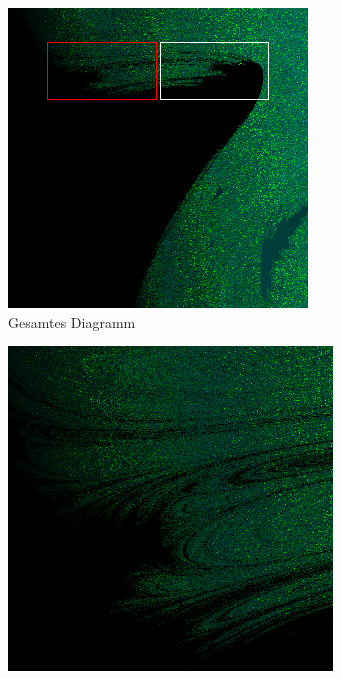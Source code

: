 \begin{figure}
        \centering
        \begin{subfigure}[b]{0.32\textwidth}
                \centering
                \includegraphics[width=\textwidth]{images/fraktale/loopgraph_300_300_marked.png}
                \caption{Gesamtes Diagramm}
                \label{fig:fraktale_gesamt}
        \end{subfigure}
        \begin{subfigure}[b]{0.32\textwidth}
                \centering
                \includegraphics[width=\textwidth]{images/fraktale/ausschnitt_c.png}

\end{subfigure}
\end{figure}

